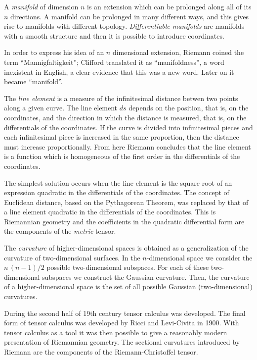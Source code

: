 \documentclass[12pt]{article}
\begin{document}
A {\it manifold} of dimension $n$ is an extension which can be prolonged along all of its $n$ directions. A manifold can be prolonged in many different ways, and this gives rise to manifolds with different topology. {\it Differentiable manifolds} are manifolds with a smooth structure and then it is possible to introduce coordinates.

In order to express his idea of an $n$ dimensional extension, Riemann coined the term ``Mannigfaltigkeit''; Clifford \cite{Clifford1873} translated it as ``manifoldness'', a word inexistent in English, a clear evidence that this was a new word. Later on it became ``manifold''.

The {\it line element} is a measure of the infinitesimal distance betwen two points along a given curve. The line element $ds$ depends on the position, that is, on the coordinates, and the direction in which the distance is measured, that is, on the differentials of the coordinates. If the curve is divided into infinitesimal pieces and each infinitesimal piece is increased in the same proportion, then the distance must increase proportionally. From here Riemann concludes that the line element is a function which is homogeneous of the first order in the differentials of the coordinates.

The simplest solution occurs when the line element is the square root of an expression quadratic in the differentials of the coordinates. The concept of Euclidean distance, based on the Pythagorean Theorem, was replaced by that of a line element quadratic in the differentials of the coordinates. This is Riemannian geometry and the coefficients in the quadratic differential form are the components of the {\it metric} tensor.

The {\it curvature} of higher-dimensional spaces is obtained as a generalization of the curvature of two-dimensional surfaces. In the $n$-dimensional space we consider the $n\,(n-1)/2$ possible two-dimensional subspaces. For each of these two-dimensional subspaces we construct the Gaussian curvature. Then, the curvature of a higher-dimensional space is the set of all possible Gaussian (two-dimensional) curvatures.

During the second half of 19th century tensor calculus was developed. The final form of tensor calculus was developed by Ricci and Levi-Civita in 1900. With tensor calculus as a tool it was then possible to give a reasonably modern presentation of Riemannian geometry. The sectional curvatures introduced by Riemann are the components of the Riemann-Christoffel tensor.
\end{document}
